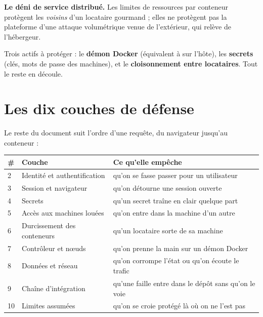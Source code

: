 \textbf{Le déni de service distribué.} Les limites de ressources par conteneur
protègent les \emph{voisins} d'un locataire gourmand ; elles ne protègent pas la
plateforme d'une attaque volumétrique venue de l'extérieur, qui relève de
l'hébergeur.

\begin{retenir}
Trois actifs à protéger : le \textbf{démon Docker} (équivalent à  sur
l'hôte), les \textbf{secrets} (clés, mots de passe des machines), et le
\textbf{cloisonnement entre locataires}. Tout le reste en découle.
\end{retenir}

\section*{Les dix couches de défense}

Le reste du document suit l'ordre d'une requête, du navigateur jusqu'au
conteneur :

\begin{center}
\small
\begin{tabularx}{\textwidth}{@{}p{0.6cm}p{4.2cm}X@{}}
\toprule
\textbf{\#} & \textbf{Couche} & \textbf{Ce qu'elle empêche} \\
\midrule
2 & Identité et authentification & qu'on se fasse passer pour un utilisateur \\
3 & Session et navigateur & qu'on détourne une session ouverte \\
4 & Secrets & qu'un secret traîne en clair quelque part \\
5 & Accès aux machines louées & qu'on entre dans la machine d'un autre \\
6 & Durcissement des conteneurs & qu'un locataire sorte de sa machine \\
7 & Contrôleur et nœuds & qu'on prenne la main sur un démon Docker \\
8 & Données et réseau & qu'on corrompe l'état ou qu'on écoute le trafic \\
9 & Chaîne d'intégration & qu'une faille entre dans le dépôt sans qu'on le voie \\
10 & Limites assumées & qu'on se croie protégé là où on ne l'est pas \\
\bottomrule
\end{tabularx}
\end{center}
